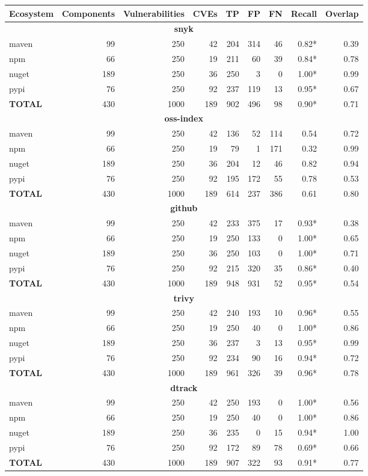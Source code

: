 \begin{table}[!t]
\centering
\small
\begin{tabular}{lrrrrrrrr}
\toprule
Ecosystem & Components & Vulnerabilities & CVEs & TP & FP & FN & Recall & Overlap \\
\midrule
\multicolumn{9}{c}{\textbf{snyk}} \\
\midrule
maven & 99 & 250 & 42 & 204 & 314 & 46 & 0.82* & 0.39 \\
npm & 66 & 250 & 19 & 211 & 60 & 39 & 0.84* & 0.78 \\
nuget & 189 & 250 & 36 & 250 & 3 & 0 & 1.00* & 0.99 \\
pypi & 76 & 250 & 92 & 237 & 119 & 13 & 0.95* & 0.67 \\
\midrule
\textbf{TOTAL} & 430 & 1000 & 189 & 902 & 496 & 98 & 0.90* & 0.71 \\
\midrule
\multicolumn{9}{c}{\textbf{oss-index}} \\
\midrule
maven & 99 & 250 & 42 & 136 & 52 & 114 & 0.54 & 0.72 \\
npm & 66 & 250 & 19 & 79 & 1 & 171 & 0.32 & 0.99 \\
nuget & 189 & 250 & 36 & 204 & 12 & 46 & 0.82 & 0.94 \\
pypi & 76 & 250 & 92 & 195 & 172 & 55 & 0.78 & 0.53 \\
\midrule
\textbf{TOTAL} & 430 & 1000 & 189 & 614 & 237 & 386 & 0.61 & 0.80 \\
\midrule
\multicolumn{9}{c}{\textbf{github}} \\
\midrule
maven & 99 & 250 & 42 & 233 & 375 & 17 & 0.93* & 0.38 \\
npm & 66 & 250 & 19 & 250 & 133 & 0 & 1.00* & 0.65 \\
nuget & 189 & 250 & 36 & 250 & 103 & 0 & 1.00* & 0.71 \\
pypi & 76 & 250 & 92 & 215 & 320 & 35 & 0.86* & 0.40 \\
\midrule
\textbf{TOTAL} & 430 & 1000 & 189 & 948 & 931 & 52 & 0.95* & 0.54 \\
\midrule
\multicolumn{9}{c}{\textbf{trivy}} \\
\midrule
maven & 99 & 250 & 42 & 240 & 193 & 10 & 0.96* & 0.55 \\
npm & 66 & 250 & 19 & 250 & 40 & 0 & 1.00* & 0.86 \\
nuget & 189 & 250 & 36 & 237 & 3 & 13 & 0.95* & 0.99 \\
pypi & 76 & 250 & 92 & 234 & 90 & 16 & 0.94* & 0.72 \\
\midrule
\textbf{TOTAL} & 430 & 1000 & 189 & 961 & 326 & 39 & 0.96* & 0.78 \\
\midrule
\multicolumn{9}{c}{\textbf{dtrack}} \\
\midrule
maven & 99 & 250 & 42 & 250 & 193 & 0 & 1.00* & 0.56 \\
npm & 66 & 250 & 19 & 250 & 40 & 0 & 1.00* & 0.86 \\
nuget & 189 & 250 & 36 & 235 & 0 & 15 & 0.94* & 1.00 \\
pypi & 76 & 250 & 92 & 172 & 89 & 78 & 0.69* & 0.66 \\
\midrule
\textbf{TOTAL} & 430 & 1000 & 189 & 907 & 322 & 93 & 0.91* & 0.77 \\
\midrule
\bottomrule
\end{tabular}
\end{table}
